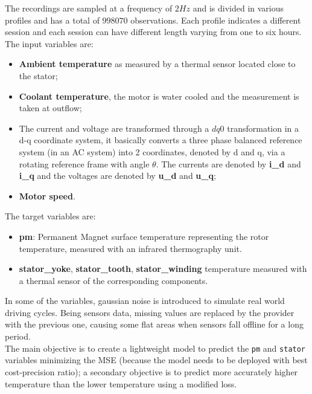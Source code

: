 The recordings are sampled at a frequency of $2Hz$ and is divided in various profiles and has a total of $998070$ observations. 
Each profile indicates a different session and each session can have different length varying from one to six hours.\\
The input variables are:
\begin{itemize}[topsep=0ex, noitemsep]
    \item \textbf{Ambient temperature} as measured by a thermal sensor located close to the stator;
    \item \textbf{Coolant temperature}, the motor is water cooled and the measurement is taken at outflow;
    \item The current and voltage are transformed through a $dq0$ transformation in a d-q coordinate system, it basically converts a three phase balanced reference system (in an AC system) into 2 coordinates, denoted by d and q, via a rotating reference frame with angle $\theta$.
    The currents are denoted by \textbf{i\_d} and \textbf{i\_q} and the voltages are denoted by \textbf{u\_d} and \textbf{u\_q};
    \item \textbf{Motor speed}.
\end{itemize}
The target variables are:
\begin{itemize}[topsep=0ex, noitemsep]
    \item \textbf{pm}: Permanent Magnet surface temperature representing the rotor temperature, measured with an infrared thermography unit.
    \item \textbf{stator\_yoke}, \textbf{stator\_tooth}, \textbf{stator\_winding} temperature measured with a thermal sensor of the corresponding components.
\end{itemize}
In some of the variables, gaussian noise is introduced to simulate real world driving cycles.
Being sensors data, missing values are replaced by the provider with the previous one, causing some flat areas when sensors fall offline for a long period. \\
The main objective is to create a lightweight model to predict the \verb|pm| and \verb|stator| variables minimizing the MSE (because the model needs to be deployed with best cost-precision ratio); a secondary objective is to predict more accurately higher temperature than the lower temperature using a modified loss.

